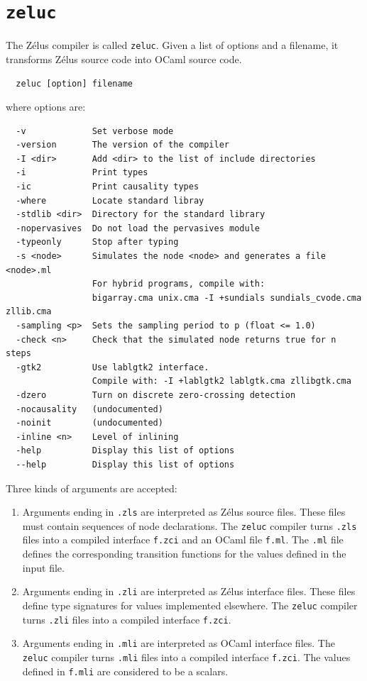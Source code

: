 \documentclass[11pt,titlepage,twoside]{report}
\newcommand{\zelus}{{\sf Z\'elus}}
\newcommand{\ocaml}{{\sf OCaml}}
\begin{document}
\chapter{\texttt{zeluc}\label{zeluc}} %

The \zelus{} compiler is called \texttt{zeluc}.
Given a list of options and a filename, it transforms \zelus{} source code 
into \ocaml{} source code.

\begin{verbatim}
  zeluc [option] filename
\end{verbatim}
where options are:
\begin{verbatim}
  -v             Set verbose mode
  -version       The version of the compiler
  -I <dir>       Add <dir> to the list of include directories
  -i             Print types
  -ic            Print causality types
  -where         Locate standard libray
  -stdlib <dir>  Directory for the standard library
  -nopervasives  Do not load the pervasives module
  -typeonly      Stop after typing
  -s <node>      Simulates the node <node> and generates a file <node>.ml 
                 For hybrid programs, compile with:
                 bigarray.cma unix.cma -I +sundials sundials_cvode.cma zllib.cma
  -sampling <p>  Sets the sampling period to p (float <= 1.0)
  -check <n>     Check that the simulated node returns true for n steps
  -gtk2          Use lablgtk2 interface.
                 Compile with: -I +lablgtk2 lablgtk.cma zllibgtk.cma
  -dzero         Turn on discrete zero-crossing detection
  -nocausality   (undocumented)
  -noinit        (undocumented)
  -inline <n>    Level of inlining
  -help          Display this list of options
  --help         Display this list of options
\end{verbatim}

Three kinds of arguments are accepted:
\begin{enumerate}
\item
Arguments ending in \verb-.zls- are interpreted as \zelus{} source
files. These files must contain sequences of node declarations.
The \texttt{zeluc} compiler turns \verb-.zls- files into a
compiled interface \verb-f.zci- and an \ocaml{} file \verb-f.ml-.
The \verb-.ml- file defines the corresponding transition functions for the 
values defined in the input file.

\item
Arguments ending in \verb-.zli- are interpreted as \zelus{}
interface files.
These files define type signatures for values implemented elsewhere.
The \texttt{zeluc} compiler turns \verb-.zli- files into a
compiled interface \verb-f.zci-.

\item
Arguments ending in \verb-.mli- are interpreted as \ocaml{}
interface files.
The \texttt{zeluc} compiler turns \verb-.mli- files into a
compiled interface \verb-f.zci-.
The values defined in \verb-f.mli- are considered to be a scalars.
\end{enumerate}
\end{document}
